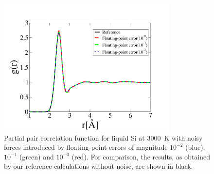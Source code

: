 \documentclass[preprint]{elsarticle}
\begin{document}
\begin{figure}
\begin{center}
\includegraphics[width=0.8\textwidth]
{Floating_point_rdf2.pdf}
\end{center}
\caption{\label{Fig2}
Partial pair correlation function for liquid Si at 3000~K with noisy forces introduced by floating-point errors of magnitude $10^{-2}$ (blue), $10^{-1}$ (green) and $10^{-0}$ (red). For comparison, the results, as obtained by our reference calculations without noise, are shown in black.
} \end{figure}
\end{document}
